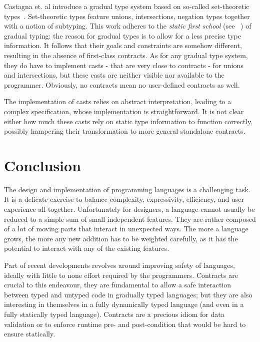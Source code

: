 \documentclass[sigplan,10pt,review,anonymous]{acmart}
\begin{document}
Castagna et. al \cite{gradualCastagna} introduce a gradual type system based on
so-called set-theoretic types~\cite{SetTheoreticTypes}.  Set-theoretic types
feature unions, intersections, negation types together with a notion of
subtyping. This work adheres to the \emph{static first school} (see
~\cite{practiceTheoryGrad}) of gradual typing: the reason for gradual types is
to allow for a less precise type information. It follows that their goals and
constraints are somehow different, resulting in the absence of first-class
contracts. As for any gradual type system, they do have to implement casts -
that are very close to contracts - for unions and intersections, but these casts
are neither visible nor available to the programmer. Obviously, no contracts
mean no user-defined contracts as well.

The implementation of casts relies on abstract interpretation, leading to a
complex specification, whose implementation is straightforward. It is not clear
either how much these casts rely on static type information to function
correctly, possibly hampering their transformation to more general standalone
contracts.

\section{Conclusion}
\label{sec:conclusion}

The design and implementation of programming languages is a challenging task. It
is a delicate exercise to balance complexity, expressivity, efficiency, and user
experience all together. Unfortunately for designers, a language cannot usually
be reduced to a simple sum of small independent features. They are rather
composed of a lot of moving parts that interact in unexpected ways. The more a
language grows, the more any new addition has to be weighted carefully, as it
has the potential to interact with any of the existing features.

Part of recent developments revolves around improving safety of languages,
ideally with little to none effort required by the programmers.  Contracts are
crucial to this endeavour, they are fundamental to allow a safe interaction
between typed and untyped code in gradually typed languages; but they are also
interesting in themselves in a fully dynamically typed language (and even in a
fully statically typed language). Contracts are a precious idiom for data
validation or to enforce runtime pre- and post-condition that would be hard to
ensure statically.
\end{document}
